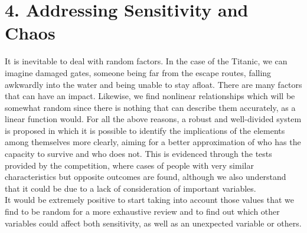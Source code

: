 \documentclass[12pt]{report}
\begin{document}
\section*{4. Addressing Sensitivity and Chaos} 
It is inevitable to deal with random factors. In the case of the Titanic, we can imagine damaged gates, someone being far from the escape routes, falling awkwardly into the water and being unable to stay afloat. There are many factors that can have an impact. Likewise, we find nonlinear relationships which will be somewhat random since there is nothing that can describe them accurately, as a linear function would. For all the above reasons, a robust and well-divided system is proposed in which it is possible to identify the implications of the elements among themselves more clearly, aiming for a better approximation of who has the capacity to survive and who does not. This is evidenced through the tests provided by the competition, where cases of people with very similar characteristics but opposite outcomes are found, although we also understand that it could be due to a lack of consideration of important variables.\\
It would be extremely positive to start taking into account those values that we find to be random for a more exhaustive review and to find out which other variables could affect both sensitivity, as well as an unexpected variable or others.
\end{document}
